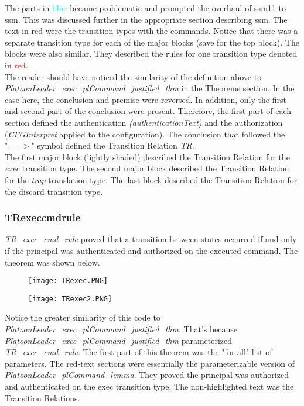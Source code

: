  The parts in \textcolor{cyan}{blue} became problematic and prompted the overhaul of ssm11 to ssm.
  This was discussed further in the appropriate section describing ssm.  The text in red
  were the transition types with the commands.  Notice that there was a separate transition
  type for each of the major blocks (save for the top block).  The blocks were also similar.
  They described the rules for one transition type denoted in \textcolor{red}{red}.\\
  
 The reader should have noticed the similarity of the definition above to
  \textit{PlatoonLeader_exec_plCommand_justified_thm} in the \underline{Theorems} section.
  In the case here, the conclusion and premise were reversed.  In addition, only the first
  and second part of the conclusion were present.  Therefore, the first part of each section
  defined the authentication \textit{(authenticationText)} and the authorization
  (\textit{CFGInterpret} applied to the configuration).  The conclusion that followed
  the "==$>$" symbol defined the Transition Relation \textit{TR}.\\
  
 The first major block (lightly shaded)  described the Transition Relation for
  the \textit{exec} transition type.  The second major block described the Transition Relation for
  the \textit{trap} translation type.  The last block described the Transition Relation for the
  discard transition type.\\


\subsubsection{TR\textunderscore exec\textunderscore cmd\textunderscore rule}
\label{sec:trtext-exect-cmdt}


  \textit{TR_exec_cmd_rule} proved that a transition between states occurred if and only if
    the principal was authenticated and authorized on the executed command.  The theorem was shown below.\\
    
  \begin{figure}[h]
  \centering
  \texttt{[image: TRexec.PNG]}
\end{figure}
\begin{figure}[h!]
  \centering
  \texttt{[image: TRexec2.PNG]}
\end{figure}

 Notice the greater similarity of this code to \textit{PlatoonLeader_exec_plCommand_justified_thm}.
  That's because \textit{PlatoonLeader_exec_plCommand_justified_thm} parameterized \textit{TR_exec_cmd_rule}.
  The first part of this theorem was the "for all" list of parameters.  The red-text sections were essentially
  the parameterizable version of \textit{PlatoonLeader_plCommand_lemma}.  They proved the principal was
  authorized and authenticated on the exec transition type.  The non-highlighted text was the Transition Relations.\\
  
